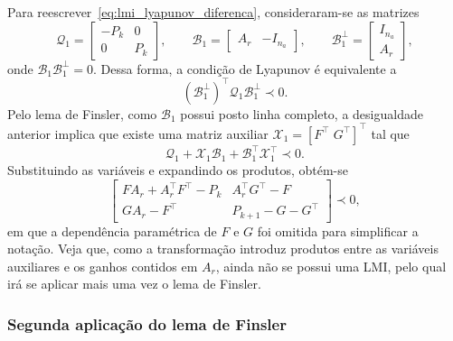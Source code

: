 \noindent
Para reescrever~\eqref{eq:lmi_lyapunov_diferenca}, consideraram-se as matrizes
\begin{equation}
    \mathcal Q_1=\begin{bmatrix}-P_k&0\\0&P_{k}\end{bmatrix},\qquad
    \mathcal B_1=\begin{bmatrix}A_r&-I_{n_a}\end{bmatrix},\qquad
    \mathcal B_1^\perp=\begin{bmatrix}I_{n_a}\\A_r\end{bmatrix},
    \label{eq:lmi_primeira_restricao}
\end{equation}
onde $\mathcal B_1\mathcal B_1^\perp=0$. Dessa forma, a condição de Lyapunov é equivalente a
\begin{equation}
 (\mathcal B_1^\perp)^\top\mathcal Q_1\mathcal B_1^\perp\prec0.
 \label{eq:lmi_condicao_nucleo}
\end{equation}
Pelo lema de Finsler, como $\mathcal B_1$ possui posto linha completo, a desigualdade anterior implica que existe uma matriz auxiliar $\mathcal X_1=[F^\top\;G^\top]^\top$ tal que
\begin{equation}
    \mathcal Q_1+\mathcal X_1\mathcal B_1+\mathcal B_1^\top\mathcal X_1^\top\prec0.
    \label{eq:lmi_finsler_1}
\end{equation}
Substituindo as variáveis e expandindo os produtos, obtém-se
\begin{equation}
 \begin{bmatrix}
 F A_r+A_r^\top F^\top-P_k & A_r^\top G^\top-F\\
 G A_r-F^\top & P_{k+1}-G-G^\top
 \end{bmatrix}\prec0,
 \label{eq:lmi_finsler_1_expandida}
\end{equation}
em que a dependência paramétrica de $F$ e $G$ foi omitida para simplificar a notação. Veja que, como a transformação introduz produtos entre as variáveis auxiliares e os ganhos contidos em $A_r$, ainda não se possui uma LMI, pelo qual irá se aplicar mais uma vez o lema de Finsler.

\subsubsection{Segunda aplicação do lema de Finsler}

